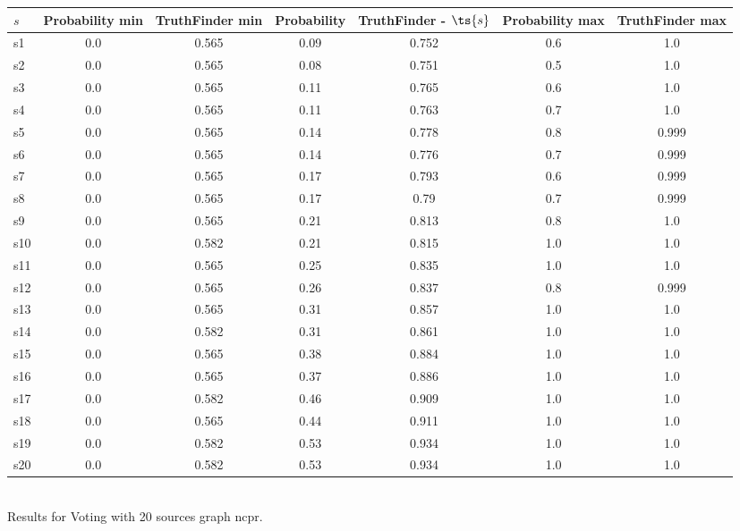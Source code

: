 \documentclass{article}
\begin{document}
\noindent\begin{tabular}{|l|c|c|c|c|c|c|}
\hline
$s$& Probability min & TruthFinder min & Probability & TruthFinder - $\ts{s}$ & Probability max & TruthFinder max\\
\hline
s1 &0.0 & 0.565 & 0.09 & 0.752 & 0.6 & 1.0\\
\hline
s2 &0.0 & 0.565 & 0.08 & 0.751 & 0.5 & 1.0\\
\hline
s3 &0.0 & 0.565 & 0.11 & 0.765 & 0.6 & 1.0\\
\hline
s4 &0.0 & 0.565 & 0.11 & 0.763 & 0.7 & 1.0\\
\hline
s5 &0.0 & 0.565 & 0.14 & 0.778 & 0.8 & 0.999\\
\hline
s6 &0.0 & 0.565 & 0.14 & 0.776 & 0.7 & 0.999\\
\hline
s7 &0.0 & 0.565 & 0.17 & 0.793 & 0.6 & 0.999\\
\hline
s8 &0.0 & 0.565 & 0.17 & 0.79 & 0.7 & 0.999\\
\hline
s9 &0.0 & 0.565 & 0.21 & 0.813 & 0.8 & 1.0\\
\hline
s10 &0.0 & 0.582 & 0.21 & 0.815 & 1.0 & 1.0\\
\hline
s11 &0.0 & 0.565 & 0.25 & 0.835 & 1.0 & 1.0\\
\hline
s12 &0.0 & 0.565 & 0.26 & 0.837 & 0.8 & 0.999\\
\hline
s13 &0.0 & 0.565 & 0.31 & 0.857 & 1.0 & 1.0\\
\hline
s14 &0.0 & 0.582 & 0.31 & 0.861 & 1.0 & 1.0\\
\hline
s15 &0.0 & 0.565 & 0.38 & 0.884 & 1.0 & 1.0\\
\hline
s16 &0.0 & 0.565 & 0.37 & 0.886 & 1.0 & 1.0\\
\hline
s17 &0.0 & 0.582 & 0.46 & 0.909 & 1.0 & 1.0\\
\hline
s18 &0.0 & 0.565 & 0.44 & 0.911 & 1.0 & 1.0\\
\hline
s19 &0.0 & 0.582 & 0.53 & 0.934 & 1.0 & 1.0\\
\hline
s20 &0.0 & 0.582 & 0.53 & 0.934 & 1.0 & 1.0\\
\hline
\end{tabular}\\

\noindent Results for Voting with 20 sources graph ncpr.
\end{document}
